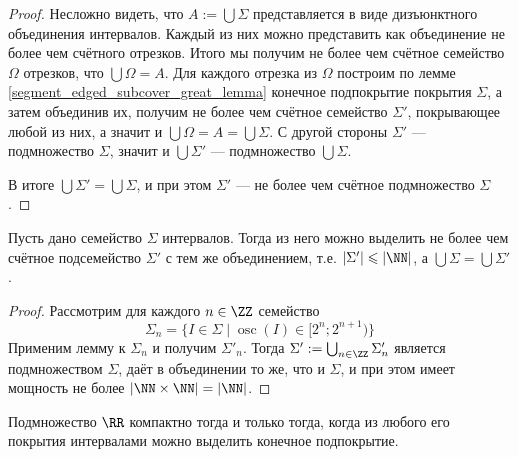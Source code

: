 \documentclass[12pt,a4paper]{article}
\DeclareMathOperator*{\osc}{osc}
\begin{document}
    \begin{proof}
        Несложно видеть, что $A := \bigcup \Sigma$ представляется в виде дизъюнктного объединения интервалов. Каждый из них можно представить как объединение не более чем счётного отрезков. Итого мы получим не более чем счётное семейство $\Omega$ отрезков, что $\bigcup \Omega = A$. Для каждого отрезка из $\Omega$ построим по лемме \ref{segment_edged_subcover_great_lemma} конечное подпокрытие покрытия $\Sigma$, а затем объединив их, получим не более чем счётное семейство $\Sigma'$, покрывающее любой из них, а значит и $\bigcup \Omega = A = \bigcup \Sigma$. С другой стороны $\Sigma'$ --- подмножество $\Sigma$, значит и $\bigcup \Sigma'$ --- подмножество $\bigcup \Sigma$.

        В итоге $\bigcup \Sigma' = \bigcup \Sigma$, и при этом $\Sigma'$ --- не более чем счётное подмножество $\Sigma$.
    \end{proof}

    \begin{lemma}
        Пусть дано семейство $\Sigma$ интервалов. Тогда из него можно выделить не более чем счётное подсемейство $\Sigma'$ с тем же объединением, т.е. $|\Sigma'| \leqslant |\NN|$, а $\bigcup \Sigma = \bigcup \Sigma'$.
    \end{lemma}

    \begin{proof}
        Рассмотрим для каждого $n \in \ZZ$ семейство
        \[\Sigma_n = \{I \in \Sigma \mid \osc(I) \in [2^n; 2^{n+1})\}\]
        Применим лемму к $\Sigma_n$ и получим $\Sigma'_n$. Тогда $\Sigma' := \bigcup_{n \in \ZZ} \Sigma'_n$ является подмножеством $\Sigma$, даёт в объединении то же, что и $\Sigma$, и при этом имеет мощность не более $|\NN \times \NN| = |\NN|$.
    \end{proof}

    \begin{theorem}
        Подмножество $\RR$ компактно тогда и только тогда, когда из любого его покрытия интервалами можно выделить конечное подпокрытие.
    \end{theorem}
\end{document}
